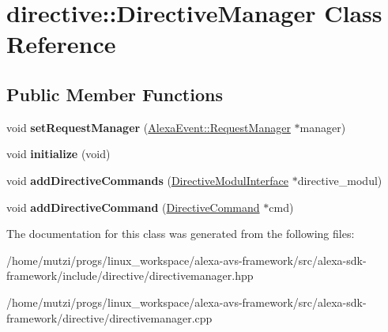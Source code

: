 \hypertarget{classdirective_1_1DirectiveManager}{}\section{directive\+:\+:Directive\+Manager Class Reference}
\label{classdirective_1_1DirectiveManager}
\subsection*{Public Member Functions}
\begin{DoxyCompactItemize}
\item 
\mbox{\label{classdirective_1_1DirectiveManager_a7c4b19f895f8332a9877fd244d8b66fd}} 
void {\bfseries set\+Request\+Manager} (\hyperlink{classAlexaEvent_1_1RequestManager}{Alexa\+Event\+::\+Request\+Manager} $\ast$manager)
\item 
\mbox{\label{classdirective_1_1DirectiveManager_af206c277d43076cd4e83bf881422d3a2}} 
void {\bfseries initialize} (void)
\item 
\mbox{\label{classdirective_1_1DirectiveManager_afccdd3aa85e29604ad906f189fb3c5db}} 
void {\bfseries add\+Directive\+Commands} (\hyperlink{classdirective_1_1DirectiveModulInterface}{Directive\+Modul\+Interface} $\ast$directive\+\_\+modul)
\item 
\mbox{\label{classdirective_1_1DirectiveManager_a943a885afd7ea796dab5fcb463e90e66}} 
void {\bfseries add\+Directive\+Command} (\hyperlink{classdirective_1_1DirectiveCommand}{Directive\+Command} $\ast$cmd)
\end{DoxyCompactItemize}


The documentation for this class was generated from the following files\+:\begin{DoxyCompactItemize}
\item 
/home/mutzi/progs/linux\+\_\+workspace/alexa-\/avs-\/framework/src/alexa-\/sdk-\/framework/include/directive/directivemanager.\+hpp\item 
/home/mutzi/progs/linux\+\_\+workspace/alexa-\/avs-\/framework/src/alexa-\/sdk-\/framework/directive/directivemanager.\+cpp\end{DoxyCompactItemize}
